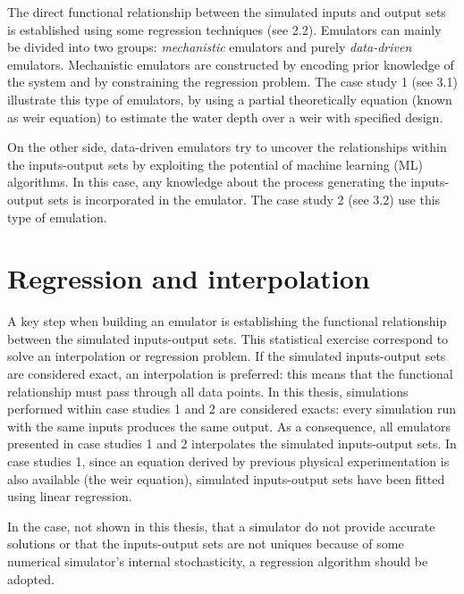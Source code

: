 The direct functional relationship between the simulated inputs and output sets is established using some regression techniques (see 2.2).
Emulators can mainly be divided into two groups: \emph{mechanistic} emulators and purely \emph{data-driven} emulators.
Mechanistic emulators are constructed by encoding prior knowledge of the system and by constraining the regression problem. The case study 1 (see 3.1) illustrate this type of emulators, by using a partial theoretically equation (known as weir equation) to estimate the water depth over a weir with specified design.

On the other side, data-driven emulators try to uncover the relationships within the inputs-output sets by exploiting the potential of machine learning (ML) algorithms. In this case, any knowledge about the process generating the inputs-output sets is incorporated in the emulator. The case study 2 (see 3.2) use this type of emulation. 

\section{Regression and interpolation}

A key step when building an emulator is establishing the functional relationship between the simulated inputs-output sets. This statistical exercise correspond to solve an interpolation or regression problem.
If the simulated inputs-output sets are considered exact, an interpolation is preferred: this means that the functional relationship must pass through all data points. In this thesis, simulations performed within case studies 1 and 2 are considered exacts: every simulation run with the same inputs produces the same output.
As a consequence, all emulators presented in case studies 1 and 2 interpolates the simulated inputs-output sets.
In case studies 1, since an equation derived by previous physical experimentation is also available (the weir equation), simulated inputs-output sets have been fitted using linear regression. 

In the case, not shown in this thesis, that a simulator do not provide accurate solutions or that the inputs-output sets are not uniques because of some numerical simulator's internal stochasticity, a regression algorithm should be adopted.

